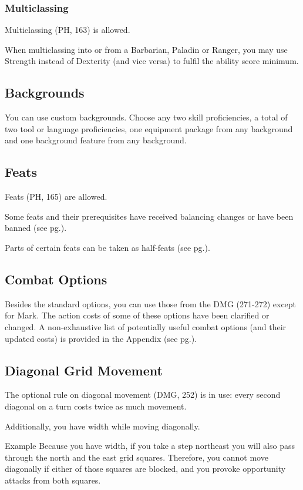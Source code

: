 \documentclass[letterpaper,twocolumn,openany,nodeprecatedcode]{dndbook}
\newcommand{\pg}[1]{pg.\pageref{#1}}
\begin{document}
\subsubsection{Multiclassing}
Multiclassing (PH, 163) is allowed. 

When multiclassing into or from a Barbarian, Paladin or Ranger, you may use Strength instead of Dexterity (and vice versa) to fulfil the ability score minimum. 

\subsection{Backgrounds}
You can use custom backgrounds. Choose any two skill proficiencies, a total of two tool or language proficiencies, one equipment package from any background and one background feature from any background.

\subsection{Feats}
Feats (PH, 165) are allowed. 

Some feats and their prerequisites have received balancing changes or have been banned (see \pg{balance-feats}).

Parts of certain feats can be taken as half-feats (see \pg{balance-feats-subfeats}).

\subsection{Combat Options}
Besides the standard options, you can use those from the DMG (271-272) except for Mark. The action costs of some of these options have been clarified or changed. A non-exhaustive list of potentially useful combat options (and their updated costs) is provided in the Appendix (see \pg{appendix-combat-options}). 

\subsection{Diagonal Grid Movement}
The optional rule on diagonal movement (DMG, 252) is in use: every second diagonal on a turn costs twice as much movement.

Additionally, you have width while moving diagonally. 

\begin{DndComment}{Example}
Because you have width, if you take a step northeast you will also pass through the north and the east grid squares. Therefore, you cannot move diagonally if either of those squares are blocked, and you provoke opportunity attacks from both squares.
\end{DndComment}
\end{document}
